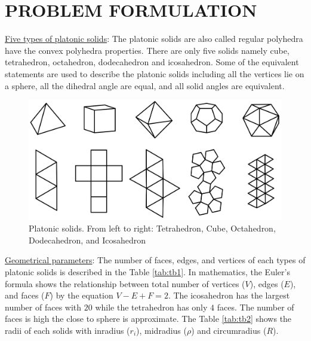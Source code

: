 \section{PROBLEM FORMULATION}
\label{sec:problemFormulation}
\noindent\uline{Five types of platonic solids}:
The platonic solids are also called regular polyhedra have the convex polyhedra properties. There are only five solids namely cube, tetrahedron, octahedron, dodecahedron and icosahedron. Some of the equivalent statements are used to describe the platonic solids including all the vertices lie on a sphere, all the dihedral angle are equal, and all solid angles are equivalent.\\

\begin{figure}[h]
\centering
	\includegraphics[width=1\textwidth]{image/5Platonic1.png}
	\caption{Platonic solids. From left to right: Tetrahedron, Cube, Octahedron, Dodecahedron, and Icosahedron}
	\label{fig:platonicSolids}
\end{figure}
%
% 
%
%
%
\noindent \uline{Geometrical parameters}: 
The number of faces, edges, and vertices of each types of platonic solids is described in the Table \ref{tab:tb1}. In mathematics, the Euler's formula shows the relationship between total number of vertices ($V$), edges ($E$), and faces ($F$) by the equation $V-E+F=2$. The icosahedron has the largest number of faces with $20$ while the tetrahedron has only $4$ faces. The number of faces is high the close to sphere is approximate.
%
%
%
The Table \ref{tab:tb2} shows the radii of each solids with inradius ($r_i$), midradius ($\rho$) and circumradius ($R$).\\

